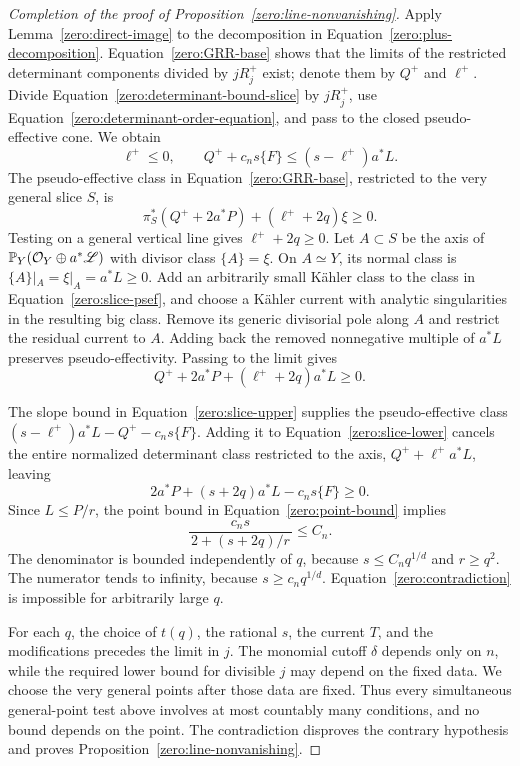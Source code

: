 \begin{proof}[Completion of the proof of Proposition~\ref{zero:line-nonvanishing}]
Apply Lemma~\ref{zero:direct-image} to the decomposition in
Equation~\eqref{zero:plus-decomposition}.  Equation~\eqref{zero:GRR-base}
shows that the limits of the restricted determinant components divided by
\(jR_j^+\) exist; denote them by \(Q^+\) and \(\ell^+\).  Divide
Equation~\eqref{zero:determinant-bound-slice} by \(jR_j^+\), use
Equation~\eqref{zero:determinant-order-equation}, and pass to the closed
pseudo-effective cone.  We obtain
\begin{equation}\label{zero:slice-upper}
 \ell^+\le0,\qquad
 Q^++c_ns\{F\}\le(s-\ell^+)a^*L.
\end{equation}
The pseudo-effective class in Equation~\eqref{zero:GRR-base}, restricted to the
very general slice \(S\), is
\begin{equation}\label{zero:slice-psef}
 \pi_S^*(Q^++2a^*P)+(\ell^++2q)\xi\ge0.
\end{equation}
Testing on a general vertical line gives \(\ell^++2q\ge0\).
Let \(A\subset S\) be the axis of
\(\mathbb{P}_Y(\mathcal O_Y\oplus a^*\mathscr L)\) with divisor class \(\{A\}=\xi\).
On \(A\simeq Y\), its normal class is \(\{A\}|_A=\xi|_A=a^*L\ge0\).
Add an arbitrarily small Kähler class to the class in
Equation~\eqref{zero:slice-psef}, and choose a Kähler current with analytic
singularities in the resulting big class.  Remove its generic divisorial
pole along \(A\) and restrict
the residual current to \(A\).  Adding back the removed nonnegative multiple
of \(a^*L\) preserves pseudo-effectivity.  Passing to the limit gives
\begin{equation}\label{zero:slice-lower}
 Q^++2a^*P+(\ell^++2q)a^*L\ge0.
\end{equation}

The slope bound in Equation~\eqref{zero:slice-upper} supplies the
pseudo-effective class \((s-\ell^+)a^*L-Q^+-c_ns\{F\}\).  Adding it to
Equation~\eqref{zero:slice-lower} cancels the entire normalized determinant
class restricted to the axis, \(Q^++\ell^+a^*L\), leaving
\[
 2a^*P+(s+2q)a^*L-c_ns\{F\}\ge0.
\]
Since \(L\le P/r\), the point bound in Equation~\eqref{zero:point-bound} implies
\begin{equation}\label{zero:contradiction}
 \frac{c_ns}{\,2+(s+2q)/r\,}\le C_n.
\end{equation}
The denominator is bounded independently of \(q\), because
\(s\le C_nq^{1/d}\) and \(r\ge q^2\).  The numerator tends to
infinity, because \(s\ge c_nq^{1/d}\).  Equation~\eqref{zero:contradiction}
is impossible for arbitrarily large \(q\).

For each \(q\), the choice of \(t(q)\), the rational \(s\), the current
\(T\), and the modifications precedes the limit in \(j\).  The monomial
cutoff \(\delta\) depends only on \(n\), while the required lower bound for
divisible \(j\) may depend on the fixed data.  We choose the very general
points after those data are fixed.
Thus every simultaneous general-point test above involves at most
countably many conditions, and no bound depends on the point.
The contradiction disproves the contrary hypothesis and proves
Proposition~\ref{zero:line-nonvanishing}.
\end{proof}

